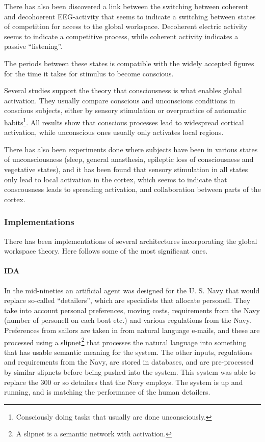 There has also been discovered a link between the switching between coherent and decohoerent EEG-activity that seems to indicate a switching between states of competition for access to the global workspace. Decoherent electric activity seems to indicate a competitive process, while coherent activity indicates a passive ``listening''.\cite{freeman2003neurobiological}

The periods between these states is compatible with the widely accepted figures for the time it takes for stimulus to become conscious.\cite{shanahan2005applying}

Several studies support the theory that consciousness is what enables global activation. They usually compare conscious and unconscious conditions in conscious subjects, either by sensory stimulation or overpractice of automatic habits\footnote{Consciously doing tasks that usually are done unconsciously.}. All results show that conscious processes lead to widespread cortical activation, while unconscious ones usually only activates local regions.\cite{baars2003brain}

There has also been experiments done where subjects have been in various states of unconsciousness (sleep, general anasthesia, epileptic loss of consciousness and vegetative states), and it has been found that sensory stimulation in all states only lead to local activation in the cortex, which seems to indicate that conscousness leads to spreading activation, and collaboration between parts of the cortex.\cite{shanahan2005applying}

\subsubsection{Implementations}
There has been implementations of several architectures incorporating the global workspace theory. Here follows some of the most significant ones.

\paragraph{IDA}
In the mid-nineties an artificial agent was designed for the U. S. Navy that would replace so-called ``detailers'', which are specialists that allocate personell. They take into account personal preferences, moving costs, requirements from the Navy (number of personell on each boat etc.) and various regulations from the Navy. Preferences from sailors are taken in from natural language e-mails, and these are processed using a slipnet\footnote{A slipnet is a semantic network with activation.} that processes the natural language into something that has usable semantic meaning for the system. The other inputs, regulations and requirements from the Navy, are stored in databases, and are pre-processed by similar slipnets before being pushed into the system. This system was able to replace the 300 or so detailers that the Navy employs. The system is up and running, and is matching the performance of the human detailers. \cite{baars2007architectural}\cite{franklin1998ida}

